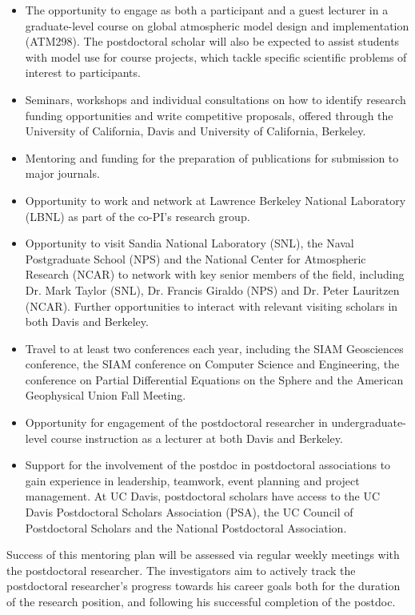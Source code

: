 \documentclass[11pt]{article}
\begin{document}
\vspace{-0.4cm}
\begin{itemize}
\item The opportunity to engage as both a participant and a guest lecturer in a graduate-level course on global atmospheric model design and implementation (ATM298).  The postdoctoral scholar will also be expected to assist students with model use for course projects, which tackle specific scientific problems of interest to participants.
\item Seminars, workshops and individual consultations on how to identify research funding opportunities and write competitive proposals, offered through the University of California, Davis and University of California, Berkeley.
\item Mentoring and funding for the preparation of publications for submission to major journals.
\item Opportunity to work and network at Lawrence Berkeley National Laboratory (LBNL) as part of the co-PI's research group.
\item Opportunity to visit Sandia National Laboratory (SNL), the Naval Postgraduate School (NPS) and the National Center for Atmospheric Research (NCAR) to network with key senior members of the field, including  Dr. Mark Taylor (SNL), Dr. Francis Giraldo (NPS) and Dr. Peter Lauritzen (NCAR).  Further opportunities to interact with relevant visiting scholars in both Davis and Berkeley.
\item Travel to at least two conferences each year, including the SIAM Geosciences conference, the SIAM conference on Computer Science and Engineering, the conference on Partial Differential Equations on the Sphere and the American Geophysical Union Fall Meeting.
\item Opportunity for engagement of the postdoctoral researcher in undergraduate-level course instruction as a lecturer at both Davis and Berkeley.
\item Support for the involvement of the postdoc in postdoctoral associations to gain experience in leadership, teamwork, event planning and project management.  At UC Davis, postdoctoral scholars have access to the UC Davis Postdoctoral Scholars Association (PSA), the UC Council of Postdoctoral Scholars and the National Postdoctoral Association.
\end{itemize}

\vspace{-0.4cm}
Success of this mentoring plan will be assessed via regular weekly meetings with the postdoctoral researcher.  The investigators aim to actively track the postdoctoral researcher's progress towards his career goals both for the duration of the research position, and following his successful completion of the postdoc.
\end{document}
